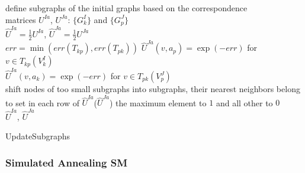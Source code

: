 \documentclass[
	fontsize=12pt,
	paper=a4,
	twoside=false,
	numbers=noenddot,
	plainheadsepline,
	toc=listof,
	toc=bibliography
]{scrartcl}
\begin{document}
\vspace{20pt}
\begin{algorithm}[H]
	\nl define subgraphs of the initial graphs based on the correspondence \\
	matrices $U^{Ia}$, $U^{Ja}$: $\{G^I_k\}$ and  $\{G^J_p\}$ \\
	\nl $\hat{U}^{Ia} = \frac{1}{2}U^{Ia}$, $\hat{U}^{Ja} = \frac{1}{2}U^{Ja}$ \\
	\nl {}
			{
				{ 
			      $err = \min(err(T_{kp}), err(T_{pk}))$ 
			         {
			          $\hat{U}^{Ja}(v, a_p) = \exp(-err)$ for $v\in T_{kp}(V^{I}_k)$ \\
   		 	          $\hat{U}^{Ia}(v, a_k) = \exp(-err)$ for $v\in T_{pk}(V^{J}_p)$ \\
   		 	         }
   		 	    }
    		 	{shift nodes of too small subgraphs into subgraphs, their nearest neighbors belong to} 
		    }			
	\nl  set in each row of  $\hat{U}^{Ia}$($\hat{U}^{Ja}$) the maximum element to $1$ and all other to $0$\\
	\Return $\hat{U}^{Ia}$, $\hat{U}^{Ja}$
	
	\caption{UpdateSubgraphs}    \label{alg:update_subgraphs}
\end{algorithm}

\FloatBarrier

\subsubsection{Simulated Annealing \textbf{SM}}
\end{document}
